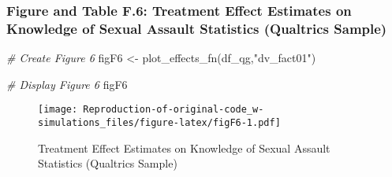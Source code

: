 \documentclass[
]{article}
\newenvironment{Shaded}{\begin{snugshade}}{\end{snugshade}}
\newcommand{\CommentTok}[1]{\textcolor[rgb]{0.56,0.35,0.01}{\textit{#1}}}
\newcommand{\FunctionTok}[1]{\textcolor[rgb]{0.00,0.00,0.00}{#1}}
\newcommand{\NormalTok}[1]{#1}
\newcommand{\OtherTok}[1]{\textcolor[rgb]{0.56,0.35,0.01}{#1}}
\newcommand{\SpecialCharTok}[1]{\textcolor[rgb]{0.00,0.00,0.00}{#1}}
\newcommand{\StringTok}[1]{\textcolor[rgb]{0.31,0.60,0.02}{#1}}
\begin{document}
\hypertarget{figure-and-table-f.6-treatment-effect-estimates-on-knowledge-of-sexual-assault-statistics-qualtrics-sample}{%
\subsubsection{Figure and Table F.6: Treatment Effect Estimates on
Knowledge of Sexual Assault Statistics (Qualtrics
Sample)}\label{figure-and-table-f.6-treatment-effect-estimates-on-knowledge-of-sexual-assault-statistics-qualtrics-sample}}

\begin{Shaded}
\begin{Highlighting}[]
\CommentTok{\# Create Figure 6}
\NormalTok{figF6 }\OtherTok{\textless{}{-}} \FunctionTok{plot\_effects\_fn}\NormalTok{(df\_qg,}\StringTok{"dv\_fact01"}\NormalTok{) }

\CommentTok{\# Display Figure 6}
\NormalTok{figF6 }
\end{Highlighting}
\end{Shaded}

\begin{figure}
\centering
\texttt{[image: Reproduction-of-original-code\_w-simulations\_files/figure-latex/figF6-1.pdf]}
\caption{Treatment Effect Estimates on Knowledge of Sexual Assault
Statistics (Qualtrics Sample)}
\end{figure}

\begin{Shaded}
\end{Shaded}
\end{document}
